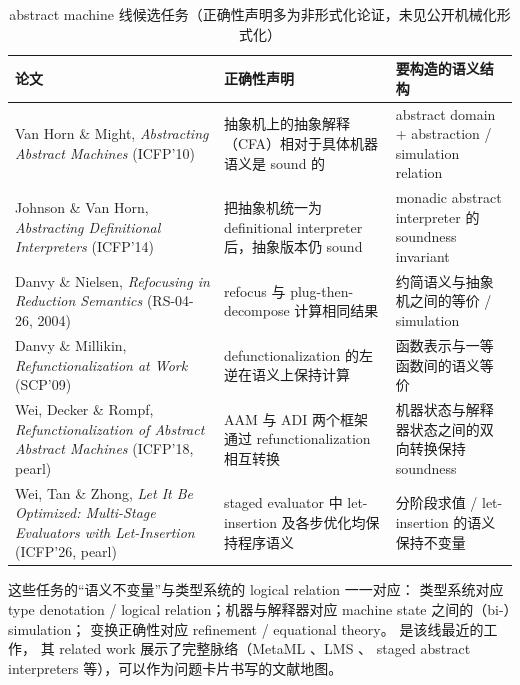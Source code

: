 \begin{table}[htbp]
\centering
\caption{abstract machine 线候选任务（正确性声明多为非形式化论证，未见公开机械化形式化）}
\label{tab:machine-line}
\begin{tabular}{@{}>{\raggedright\arraybackslash}p{}>{\raggedright\arraybackslash}p{}>{\raggedright\arraybackslash}p{}@{}}
\toprule
\textbf{论文} & \textbf{正确性声明} & \textbf{要构造的语义结构} \\
\midrule
Van Horn \& Might, \emph{Abstracting Abstract Machines} (ICFP'10) \citep{VanHornMight2010AAM}
  & 抽象机上的抽象解释（CFA）相对于具体机器语义是 sound 的
  & abstract domain + abstraction / simulation relation \\
Johnson \& Van Horn, \emph{Abstracting Definitional Interpreters} (ICFP'14) \citep{JohnsonVanHorn2014ADI}
  & 把抽象机统一为 definitional interpreter 后，抽象版本仍 sound
  & monadic abstract interpreter 的 soundness invariant \\
Danvy \& Nielsen, \emph{Refocusing in Reduction Semantics} (RS-04-26, 2004) \citep{DanvyNielsen2004Refocusing}
  & refocus 与 plug-then-decompose 计算相同结果
  & 约简语义与抽象机之间的等价 / simulation \\
Danvy \& Millikin, \emph{Refunctionalization at Work} (SCP'09) \citep{DanvyMillikin2009Refunctionalization}
  & defunctionalization 的左逆在语义上保持计算
  & 函数表示与一等函数间的语义等价 \\
Wei, Decker \& Rompf, \emph{Refunctionalization of Abstract Abstract Machines} (ICFP'18, pearl) \citep{Wei2018RefunctionalizationAAM}
  & AAM 与 ADI 两个框架通过 refunctionalization 相互转换
  & 机器状态与解释器状态之间的双向转换保持 soundness \\
Wei, Tan \& Zhong, \emph{Let It Be Optimized: Multi-Stage Evaluators with Let-Insertion} (ICFP'26, pearl) \citep{Wei2026LetItBeOptimized}
  & staged evaluator 中 \mbox{let-insertion} 及各步优化均保持程序语义
  & 分阶段求值 / \mbox{let-insertion} 的语义保持不变量 \\
\bottomrule
\end{tabular}
\end{table}

\noindent
这些任务的``语义不变量''与类型系统的 logical relation 一一对应：
类型系统对应 type denotation / logical relation；机器与解释器对应 machine state 之间的（bi-）simulation；
变换正确性对应 refinement / equational theory。\citet{Wei2026LetItBeOptimized} 是该线最近的工作，
其 related work 展示了完整脉络（MetaML \citep{TahaSheard2000MetaML}、LMS \citep{RompfOdersky2010LMS}、
staged abstract interpreters \citep{Wei2019StagedAI} 等），可以作为问题卡片书写的文献地图。

